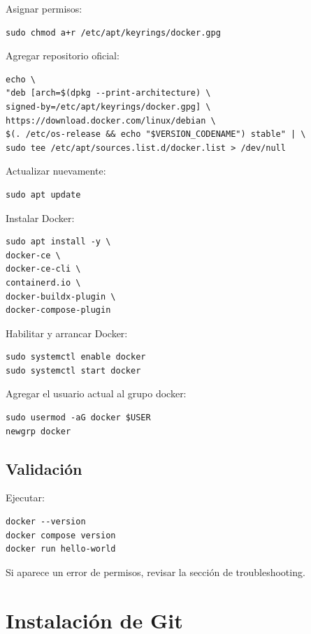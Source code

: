 \documentclass[
  coursetitle={Cómputo Nube y Tecnologías Emergentes},
  coursehours={96},
  coursedate={Verano 2026},
  doctype={Práctica},
  otherlangs={english,french},
  authorname={Lázaro},
  authorsurname={Bustio-Martínez},
  authortitle={PhD},
  role={Profesor Investigador},
  email={lbustio@inaoe.mx},
  phone={5559504000},
  ext={7459},
  institution={Instituto Nacional de Astrofísica, Óptica y Electrónica (INAOE)},
  department={Maestría en Ciencias en Tecnologías de Seguridad},
  address={Luis Enrique Erro 1, Sta. Ma. Tonantzintla, San Andrés Cholula, CP 72840, Puebla, México},
  margin={0.5in}
]{../../lbustio_lecture_notes}
\begin{document}
Asignar permisos:

\begin{lstlisting}
sudo chmod a+r /etc/apt/keyrings/docker.gpg
\end{lstlisting}

Agregar repositorio oficial:

\begin{lstlisting}
echo \
"deb [arch=$(dpkg --print-architecture) \
signed-by=/etc/apt/keyrings/docker.gpg] \
https://download.docker.com/linux/debian \
$(. /etc/os-release && echo "$VERSION_CODENAME") stable" | \
sudo tee /etc/apt/sources.list.d/docker.list > /dev/null
\end{lstlisting}

Actualizar nuevamente:

\begin{lstlisting}
sudo apt update
\end{lstlisting}

Instalar Docker:

\begin{lstlisting}
sudo apt install -y \
docker-ce \
docker-ce-cli \
containerd.io \
docker-buildx-plugin \
docker-compose-plugin
\end{lstlisting}

Habilitar y arrancar Docker:

\begin{lstlisting}
sudo systemctl enable docker
sudo systemctl start docker
\end{lstlisting}

Agregar el usuario actual al grupo docker:

\begin{lstlisting}
sudo usermod -aG docker $USER
newgrp docker
\end{lstlisting}

\subsection{Validación}

Ejecutar:

\begin{lstlisting}
docker --version
docker compose version
docker run hello-world
\end{lstlisting}

Si aparece un error de permisos, revisar la sección de troubleshooting.

\section{Instalación de Git}
\end{document}
